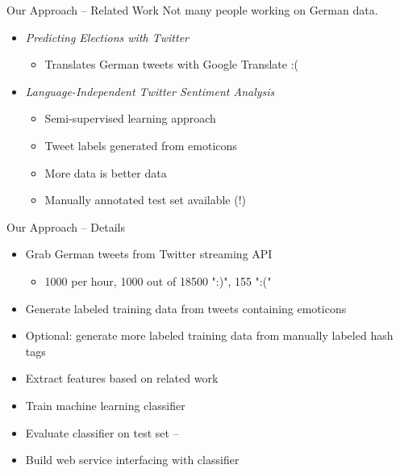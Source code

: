 \documentclass[12pt,a4paper]{beamer}
\begin{document}
\begin{frame}{Our Approach -- Related Work}
Not many people working on German data.
\begin{itemize}
\item \textit{Predicting Elections with Twitter} \cite{elections}
  \begin{itemize}
  \item Translates German tweets with Google Translate :(
  \end{itemize}
\item \textit{Language-Independent Twitter Sentiment Analysis} \cite{narr}
  \begin{itemize}
  \item Semi-supervised learning approach
  \item Tweet labels generated from emoticons
  \item More data is better data
  \item Manually annotated test set available (!)
  \end{itemize}
\end{itemize}
\end{frame}


\begin{frame}{Our Approach -- Details}
\begin{itemize}
\item Grab German tweets from Twitter streaming API
  \begin{itemize}
  \item 1000 per hour, 1000 out of 18500 ":)", 155 ":("
  \end{itemize}
\item Generate labeled training data from tweets containing emoticons \cite{goodbadomg} \cite{emotiontokens} \cite{sentimentanalysistwitter}
\item Optional: generate more labeled training data from manually labeled hash tags \cite{goodbadomg}  
\item Extract features based on related work
\item Train machine learning classifier
\item Evaluate classifier on test set -- \cite{narr}
\item Build web service interfacing with classifier
\end{itemize}
\end{frame}
\end{document}
